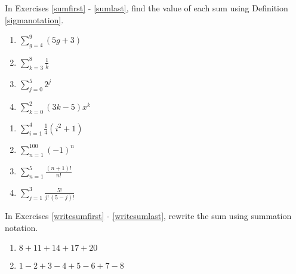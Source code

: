 \documentclass{ximera}
\begin{document}
	\author{Stitz-Zeager}



In Exercises \ref{sumfirst} - \ref{sumlast}, find the value of each sum using Definition \ref{sigmanotation}.

\begin{multicols}{4} 
\begin{enumerate}

\item $\displaystyle \sum_{g = 4}^{9} (5g + 3)$  \label{sumfirst}
\item $\displaystyle \sum_{k = 3}^{8} \frac{1}{k}$
\item $\displaystyle \sum_{j = 0}^{5} 2^{j}$
\item $\displaystyle \sum_{k = 0}^{2} (3k - 5)x^{k}$

\setcounter{HW}{\value{enumi}}
\end{enumerate}
\end{multicols}

\begin{multicols}{4}
\begin{enumerate}
\setcounter{enumi}{\value{HW}}

\item $\displaystyle \sum_{i = 1}^{4} \frac{1}{4}(i^{2} + 1)$
\item $\displaystyle \sum_{n = 1}^{100} (-1)^{n}$
\item $\displaystyle \sum_{n = 1}^{5} \frac{(n+1)!}{n!}$
\item $\displaystyle \sum_{j = 1}^{3} \frac{5!}{j! \, (5-j)!}$  \label{sumlast}

\setcounter{HW}{\value{enumi}}
\end{enumerate}
\end{multicols}

In Exercises \ref{writesumfirst} - \ref{writesumlast},  rewrite the sum using summation notation.


\begin{multicols}{2}
\begin{enumerate}
\setcounter{enumi}{\value{HW}}

\item $8 + 11 + 14 + 17 + 20$  \label{writesumfirst}
\item $1 - 2 + 3 - 4 + 5 - 6 + 7 - 8$

\setcounter{HW}{\value{enumi}}
\end{enumerate}
\end{multicols}
\end{document}
